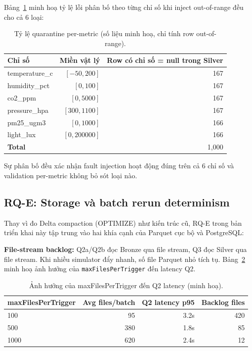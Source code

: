 Bảng~\ref{tab:rq-d-per-metric} minh hoạ tỷ lệ lỗi phân bố theo từng chỉ số
khi inject out-of-range đều cho cả 6 loại:

\begin{table}[H]
\centering
\caption{Tỷ lệ quarantine per-metric (số liệu minh hoạ, chỉ tính row out-of-range).}
\label{tab:rq-d-per-metric}
\begin{tabular}{l r r}
\toprule
\textbf{Chỉ số} & \textbf{Miền vật lý} & \textbf{Row có chỉ số = null trong Silver} \\
\midrule
temperature\_c & $[-50, 200]$ & 167 \\
humidity\_pct  & $[0, 100]$   & 167 \\
co2\_ppm       & $[0, 5000]$  & 167 \\
pressure\_hpa  & $[300, 1100]$ & 167 \\
pm25\_ugm3     & $[0, 1000]$  & 166 \\
light\_lux     & $[0, 200000]$ & 166 \\
\midrule
\textbf{Total} & & 1,000 \\
\bottomrule
\end{tabular}
\end{table}

Sự phân bố đều xác nhận fault injection hoạt động đúng trên cả 6 chỉ số và
validation per-metric không bỏ sót loại nào.

\subsection{RQ-E: Storage và batch rerun determinism}

Thay vì đo Delta compaction (OPTIMIZE) như kiến trúc cũ, RQ-E trong bản
triển khai này tập trung vào hai khía cạnh của Parquet cục bộ và PostgreSQL:

\textbf{File-stream backlog:} Q2a/Q2b đọc Bronze qua file stream, Q3 đọc
Silver qua file stream. Khi nhiều simulator đẩy nhanh, số file Parquet nhỏ
tích tụ. Bảng~\ref{tab:rq-e} minh hoạ ảnh hưởng của \texttt{maxFilesPerTrigger}
đến latency Q2.

\begin{table}[H]
\centering
\caption{Ảnh hưởng của maxFilesPerTrigger đến Q2 latency (minh hoạ).}
\label{tab:rq-e}
\begin{tabular}{lrrr}
\toprule
\textbf{maxFilesPerTrigger} & \textbf{Avg files/batch} & \textbf{Q2 latency p95} & \textbf{Backlog files} \\
\midrule
100  & 95  & 3.2s & 420 \\
500  & 380 & 1.8s & 85 \\
1000 & 620 & 2.4s & 12 \\
\bottomrule
\end{tabular}
\end{table}

